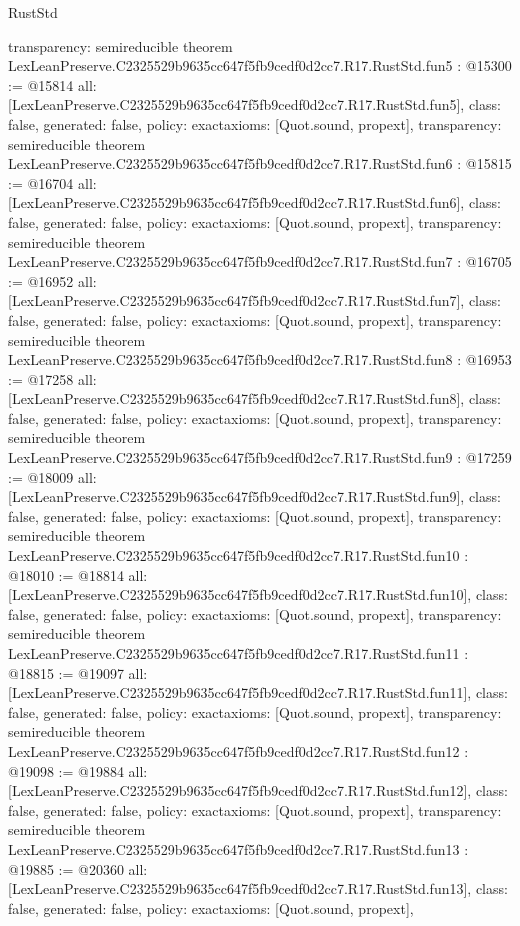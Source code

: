 \begin{lexlean}{RustStd}
\begin{coremodule}
{  transparency: semireducible
}
theorem LexLeanPreserve.C2325529b9635cc647f5fb9cedf0d2cc7.R17.RustStd.fun5 : @15300 := @15814 {
  all: [LexLeanPreserve.C2325529b9635cc647f5fb9cedf0d2cc7.R17.RustStd.fun5],
  class: false,
  generated: false,
  policy: exact{axioms: [Quot.sound, propext]},
  transparency: semireducible
}
theorem LexLeanPreserve.C2325529b9635cc647f5fb9cedf0d2cc7.R17.RustStd.fun6 : @15815 := @16704 {
  all: [LexLeanPreserve.C2325529b9635cc647f5fb9cedf0d2cc7.R17.RustStd.fun6],
  class: false,
  generated: false,
  policy: exact{axioms: [Quot.sound, propext]},
  transparency: semireducible
}
theorem LexLeanPreserve.C2325529b9635cc647f5fb9cedf0d2cc7.R17.RustStd.fun7 : @16705 := @16952 {
  all: [LexLeanPreserve.C2325529b9635cc647f5fb9cedf0d2cc7.R17.RustStd.fun7],
  class: false,
  generated: false,
  policy: exact{axioms: [Quot.sound, propext]},
  transparency: semireducible
}
theorem LexLeanPreserve.C2325529b9635cc647f5fb9cedf0d2cc7.R17.RustStd.fun8 : @16953 := @17258 {
  all: [LexLeanPreserve.C2325529b9635cc647f5fb9cedf0d2cc7.R17.RustStd.fun8],
  class: false,
  generated: false,
  policy: exact{axioms: [Quot.sound, propext]},
  transparency: semireducible
}
theorem LexLeanPreserve.C2325529b9635cc647f5fb9cedf0d2cc7.R17.RustStd.fun9 : @17259 := @18009 {
  all: [LexLeanPreserve.C2325529b9635cc647f5fb9cedf0d2cc7.R17.RustStd.fun9],
  class: false,
  generated: false,
  policy: exact{axioms: [Quot.sound, propext]},
  transparency: semireducible
}
theorem LexLeanPreserve.C2325529b9635cc647f5fb9cedf0d2cc7.R17.RustStd.fun10 : @18010 := @18814 {
  all: [LexLeanPreserve.C2325529b9635cc647f5fb9cedf0d2cc7.R17.RustStd.fun10],
  class: false,
  generated: false,
  policy: exact{axioms: [Quot.sound, propext]},
  transparency: semireducible
}
theorem LexLeanPreserve.C2325529b9635cc647f5fb9cedf0d2cc7.R17.RustStd.fun11 : @18815 := @19097 {
  all: [LexLeanPreserve.C2325529b9635cc647f5fb9cedf0d2cc7.R17.RustStd.fun11],
  class: false,
  generated: false,
  policy: exact{axioms: [Quot.sound, propext]},
  transparency: semireducible
}
theorem LexLeanPreserve.C2325529b9635cc647f5fb9cedf0d2cc7.R17.RustStd.fun12 : @19098 := @19884 {
  all: [LexLeanPreserve.C2325529b9635cc647f5fb9cedf0d2cc7.R17.RustStd.fun12],
  class: false,
  generated: false,
  policy: exact{axioms: [Quot.sound, propext]},
  transparency: semireducible
}
theorem LexLeanPreserve.C2325529b9635cc647f5fb9cedf0d2cc7.R17.RustStd.fun13 : @19885 := @20360 {
  all: [LexLeanPreserve.C2325529b9635cc647f5fb9cedf0d2cc7.R17.RustStd.fun13],
  class: false,
  generated: false,
  policy: exact{axioms: [Quot.sound, propext]},
}
\end{coremodule}
\end{lexlean}
